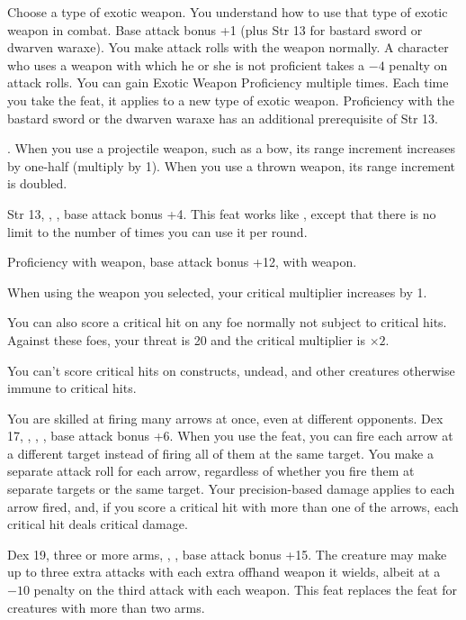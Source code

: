 {Choose a type of exotic weapon. You understand how to use that type of exotic weapon in combat.}
{Base attack bonus +1 (plus Str 13 for bastard sword or dwarven waraxe).}
{You make attack rolls with the weapon normally.}
{A character who uses a weapon with which he or she is not proficient takes a $-4$ penalty on attack rolls.}
{You can gain Exotic Weapon Proficiency multiple times. Each time you take the feat, it applies to a new type of exotic weapon. Proficiency with the bastard sword or the dwarven waraxe has an additional prerequisite of Str 13.}

{.}
{When you use a projectile weapon, such as a bow, its range increment increases by one-half (multiply by 1\onehalf). When you use a thrown weapon, its range increment is doubled.}

{Str 13, , , base attack bonus +4.}
{This feat works like , except that there is no limit to the number of times you can use it per round.}

{}
{Proficiency with weapon, base attack bonus +12,  with weapon.}
{When using the weapon you selected, your critical multiplier increases by 1.

You can also score a critical hit on any foe normally not subject to critical hits. Against these foes, your threat is 20 and the critical multiplier is $\times2$.}
{You can't score critical hits on constructs, undead, and other creatures otherwise immune to critical hits.}
{}

{You are skilled at firing many arrows at once, even at different opponents.}
{Dex 17, , , , base attack bonus +6.}
{When you use the  feat, you can fire each arrow at a different target instead of firing all of them at the same target. You make a separate attack roll for each arrow, regardless of whether you fire them at separate targets or the same target. Your precision-based damage applies to each arrow fired, and, if you score a critical hit with more than one of the arrows, each critical hit deals critical damage.}{}{}

{}
{Dex 19, three or more arms, , , base attack bonus +15.}
{The creature may make up to three extra attacks with each extra offhand weapon it wields, albeit at a $-10$ penalty on the third attack with each weapon.}
{}{This feat replaces the  feat for creatures with more than two arms.}

